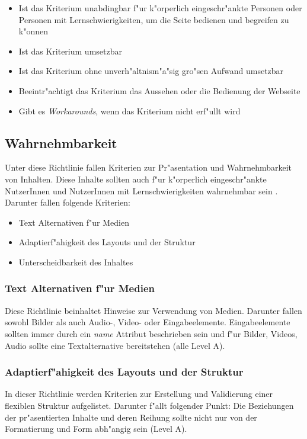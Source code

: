\documentclass[a4paper,bibtotoc,oneside]{scrbook}
\begin{document}
\begin{itemize}
\item Ist das Kriterium unabdingbar f"ur k"orperlich eingeschr"ankte Personen oder Personen mit Lernschwierigkeiten, um die Seite bedienen und begreifen zu k"onnen
\item Ist das Kriterium umsetzbar
\item Ist das Kriterium ohne unverh"altnism"a"sig gro"sen Aufwand umsetzbar
\item Beeintr"achtigt das Kriterium das Aussehen oder die Bedienung der Webseite
\item Gibt es \emph{Workarounds}, wenn das Kriterium nicht erf"ullt wird
\end{itemize}


\subsection{Wahrnehmbarkeit}
Unter diese Richtlinie fallen Kriterien zur Pr"asentation und Wahrnehmbarkeit von Inhalten. Diese Inhalte sollten auch f"ur k"orperlich eingeschr"ankte NutzerInnen und NutzerInnen mit Lernschwierigkeiten wahrnehmbar sein \cite[Abschnitt 1]{wcag2} . Darunter fallen folgende Kriterien: 

\begin{itemize}
\item Text Alternativen f"ur Medien \cite[Abschnitt 1.1 und 1.2]{wcag2}
\item Adaptierf"ahigkeit des Layouts und der Struktur \cite[Abschnitt 1.3]{wcag2}
\item Unterscheidbarkeit des Inhaltes \cite[Abschnitt 1.4]{wcag2}
\end{itemize}

\subsubsection{Text Alternativen f"ur Medien}
Diese Richtlinie beinhaltet Hinweise zur Verwendung von Medien. Darunter fallen sowohl Bilder als auch Audio-, Video- oder Eingabeelemente. Eingabeelemente sollten immer durch ein \emph{name} Attribut beschrieben sein und f"ur Bilder, Videos, Audio sollte eine Textalternative bereitstehen (alle Level A). \cite[Abschnitt 1.1 und 1.2]{wcag2}

\subsubsection{Adaptierf"ahigkeit des Layouts und der Struktur}
In dieser Richtlinie werden Kriterien zur Erstellung und Validierung einer flexiblen Struktur aufgelistet. Darunter f"allt folgender Punkt: Die Beziehungen der pr"asentierten Inhalte und deren Reihung sollte nicht nur von der Formatierung und Form abh"angig sein (Level A).\cite[Abschnitt 1.3]{wcag2}
\end{document}
